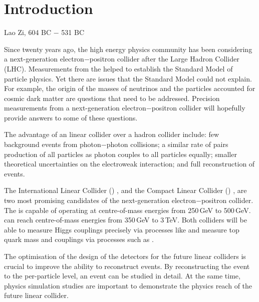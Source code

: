 \chapter{Introduction}
\label{chap:Introduction}



%
{Lao Zi, 604 BC $-$ 531 BC}%

Since twenty years ago, the high energy physics community has been considering a next-generation electron$-$positron collider after the Large Hadron Collider (LHC). Measurements from the \LHC helped to establish the Standard Model of particle physics. Yet there are issues that the Standard Model could not explain. For example, the origin of the masses of neutrinos and the particles accounted for cosmic dark matter are questions that need to be addressed. Precision measurements from a next-generation electron$-$positron collider will hopefully provide answers to some of these questions.

The advantage of an \ee linear collider over a hadron collider include: few background events from photon$-$photon collisions; a similar rate  of pairs  production of all particles as photon couples to all particles equally; smaller  theoretical uncertainties on the electroweak interaction; and full reconstruction of events.

The International Linear Collider (\ILC)  \cite{Brau:2007zza}, and the Compact Linear Collider (\CLIC) \cite{Linssen:2012hp}, are two most promising candidates of the next-generation electron$-$positron collider. The \ILC is capable of operating at centre-of-mass energies from 250\,GeV to 500\,GeV. \CLIC can reach centre-of-mass energies from 350\,GeV to 3\,TeV. Both colliders will be able to measure Higgs couplings precisely via processes like \HepProcess{\ee \to \PZ \PHiggs} and measure top quark mass and couplings via processes such as \HepProcess{\ee \to \Ptop \APtop}.

The optimisation of the design of the detectors for the future linear colliders is crucial to improve the ability to reconstruct events. By reconstructing the event to the per-particle level, an event can be studied in detail. At the same time,  physics simulation studies are important to demonstrate the physics reach of the future linear collider.

